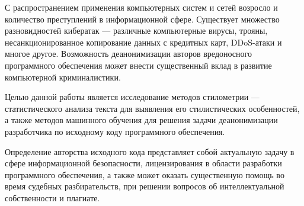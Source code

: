 С распространением применения компьютерных систем и сетей возросло и количество преступлений в информационной сфере. Существует множество разновидностей кибератак --- различные компьютерные вирусы, трояны, несанкционированное копирование данных с кредитных карт, DDoS-атаки и многое другое. Возможность деанонимизации авторов вредоносного программного обеспечения может внести существенный вклад в развитие компьютерной криминалистики.

Целью данной работы является исследование методов стилометрии --- статистического анализа текста для выявления его стилистических особенностей, а также методов машинного обучения для решения задачи деанонимизации разработчика по исходному коду программного обеспечения.

Определение авторства исходного кода представляет собой актуальную задачу в сфере информационной безопасности, лицензирования в области разработки программного обеспечения, а также может оказать существенную помощь во время судебных разбирательств, при решении вопросов об интеллектуальной собственности и плагиате.
